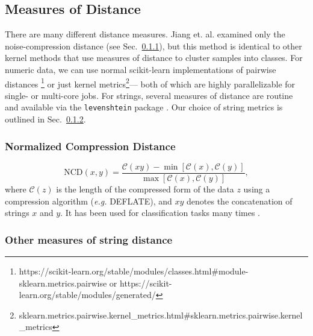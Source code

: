 \documentclass[sigconf]{acmart}
\begin{document}
  
  
  


\subsection{Measures of Distance}
There are many different distance measures. Jiang et. al. examined only the noise-compression distance (see Sec.~\ref{ncd}), but this method is identical to other kernel methods \cite{} that use measures of distance to cluster samples into classes. For numeric data, we can use normal scikit-learn implementations of pairwise distances \footnote{
https://scikit-learn.org/stable/modules/classes.html\#module-sklearn.metrics.pairwise or https://scikit-learn.org/stable/modules/generated/} or just kernel metrics\footnote{sklearn.metrics.pairwise.kernel\_metrics.html\#sklearn.metrics.pairwise.kernel\_metrics}--- both of which are highly parallelizable for single- or multi-core jobs. For strings, several measures of distance are routine and available via the \texttt{levenshtein} package \cite{levenshtein}. Our choice of string metrics is outlined in Sec.~\ref{string_metrics}.

\subsubsection{Normalized Compression Distance}
\label{ncd}
\begin{equation}
    \text{NCD}(x, y) = \frac{\mathcal{C}(xy) - \min[\mathcal{C}(x), \mathcal{C}(y)]}{\max[\mathcal{C}(x), \mathcal{C}(y)]},
\end{equation}
where $\mathcal{C}(z)$ is the length  of the compressed form of the data $z$ using a compression algorithm (\textit{e.g.} DEFLATE), and $xy$ denotes the concatenation of strings $x$ and $y$. It has been used for classification tasks many times \cite{opitz2023gzip,weinreich2023parameter,nishida2011tweet,jiang2022less}.
\subsubsection{Other measures of string distance}
\label{string_metrics}
\end{document}
